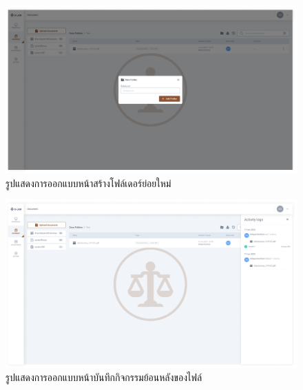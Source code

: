 \documentclass[12pt,oneside,openright,a4paper]{cpe-thai-project}
\begin{document}
\begin{figure}[!h]\centering
  \includegraphics[width=13cm]{./assets/userinterface/create-new-folder.png}
  \caption{รูปแสดงการออกแบบหน้าสร้างโฟล์เดอร์ย่อยใหม่}\label{fig:create-new-folder}
\end{figure}

\begin{figure}[!h]\centering
  \includegraphics[width=13cm]{./assets/userinterface/activity-logs.png}
  \caption{รูปแสดงการออกแบบหน้าบันทึกกิจกรรมย้อนหลังของไฟล์}\label{fig:activity-logs}
\end{figure}

\newpage
\end{document}
